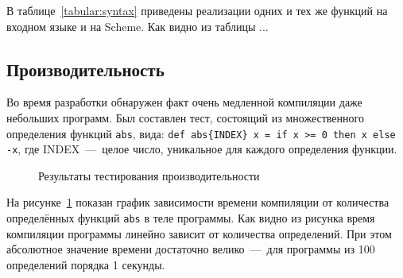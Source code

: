 \documentclass[12pt,a4paper,oneside]{extarticle}
\begin{document}
В таблице~\ref{tabular:syntax} приведены реализации одних и тех же функций на входном языке и на Scheme. Как видно из таблицы ...

    \clearpage

    \subsection{Производительность}
        \label{subsubsec:perfomance}
        Во время разработки обнаружен факт очень медленной компиляции даже небольших программ.
        Был составлен тест, состоящий из множественного определения функций \lstinline$abs$, вида: \lstinline$def abs{INDEX} x = if x >= 0 then x else -x$, где {INDEX}~---~целое число, уникальное для каждого определения функции.        
        \begin{figure}[h!]        
        \centering
        \caption{Результаты тестирования производительности}
        \label{pic:test}
        \end{figure}
        На рисунке~\ref{pic:test} показан график зависимости времени компиляции от количества определённых функций \lstinline$abs$ в теле программы. Как видно из рисунка время компиляции программы линейно зависит от количества определений. При этом абсолютное значение времени достаточно велико~---~для программы из 100 определений порядка 1 секунды.
\end{document}
